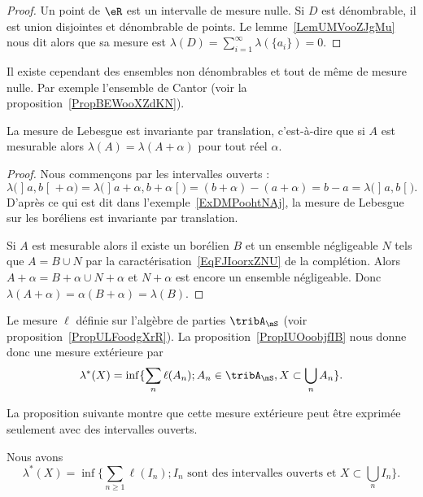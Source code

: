 \begin{proof}
    Un point de \( \eR\) est un intervalle de mesure nulle. Si \( D\) est dénombrable, il est union disjointes et dénombrable de points. Le lemme~\ref{LemUMVooZJgMu} nous dit alors que sa mesure est \( \lambda(D)=\sum_{i=1}^{\infty}\lambda(\{ a_i \})=0\).
\end{proof}

\begin{remark}
    Il existe cependant des ensembles non dénombrables et tout de même de mesure nulle. Par exemple l'ensemble de Cantor (voir la proposition~\ref{PropBEWooXZdKN}).
\end{remark}


\begin{proposition}     \label{PropooOACLooLMIUuY}
    La mesure de Lebesgue est invariante par translation, c'est-à-dire que si \( A\) est mesurable alors \( \lambda(A)=\lambda(A+\alpha)\) pour tout réel \( \alpha\).
\end{proposition}

\begin{proof}
    Nous commençons par les intervalles ouverts :
    \begin{equation}
    \lambda\big( \mathopen] a , b \mathclose[+\alpha \big)=\lambda\big( \mathopen] a+\alpha , b+\alpha \mathclose[ \big)=(b+\alpha)-(a+\alpha)=b-a=\lambda\big( \mathopen] a , b \mathclose[ \big).
    \end{equation}
    D'après ce qui est dit dans l'exemple~\ref{ExDMPoohtNAj}, la mesure de Lebesgue sur les boréliens est invariante par translation.

    Si \( A\) est mesurable alors il existe un borélien \( B\) et un ensemble négligeable \( N\) tels que \( A=B\cup N\) par la caractérisation~\ref{EqFJIoorxZNU} de la complétion. Alors \( A+\alpha=B+\alpha\cup N+\alpha\) et \( N+\alpha\) est encore un ensemble négligeable. Donc \( \lambda(A+\alpha)=\alpha(B+\alpha)=\lambda(B)\).
\end{proof}

Le mesure \( \ell\) définie sur l'algèbre de parties \( \tribA_{\mS}\) (voir proposition~\ref{PropULFoodgXrR}). La proposition~\ref{PropIUOoobjfIB} nous donne donc une mesure extérieure par
\begin{equation}    \label{EqJGXoogdKqb}
    \lambda^*(X)=\inf\{ \sum_n\ell(A_n);A_n\in\tribA_{\mS},X\subset\bigcup_nA_n \}.
\end{equation}

La proposition suivante montre que cette mesure extérieure peut être exprimée seulement avec des intervalles ouverts.
\begin{proposition} \label{PropTNOooDcfwn}
    Nous avons
    \begin{equation}
        \lambda^*(X)=\inf\{ \sum_{n\geq 1}\ell(I_n); I_n\text{ sont des intervalles ouverts et }X\subset\bigcup_nI_n \}.
    \end{equation}
\end{proposition}


